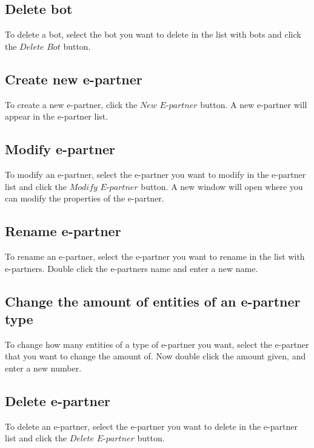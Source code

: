 \documentclass[a4paper]{article}
\begin{document}
\subsection{Delete bot}
To delete a bot, select the bot you want to delete in the list with bots and click the $Delete$ $Bot$ button.

\subsection{Create new e-partner}
To create a new e-partner, click the $New$ $E$-$partner$ button. A new e-partner will appear in the e-partner list.%

\subsection{Modify e-partner}
To modify an e-partner, select the e-partner you want to modify in the e-partner list and click the $Modify$ $E$-$partner$ button. A new window will open where you can modify the properties of the e-partner.

\subsection{Rename e-partner}
To rename an e-partner, select the e-partner you want to rename in the list with e-partners. Double click the e-partners name and enter a new name. %

\subsection{Change the amount of entities of an e-partner type}
To change how many entities of a type of e-partner you want, select the e-partner that you want to change the amount of. Now double click the amount given, and enter a new number.

\subsection{Delete e-partner}
To delete an e-partner, select the e-partner you want to delete in the e-partner list and click the $Delete$ $E$-$partner$ button.
\end{document}
